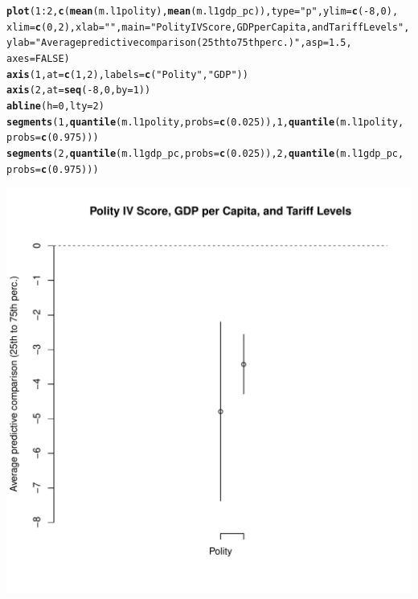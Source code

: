 \documentclass[12pt]{article}\usepackage[]{graphicx}\usepackage[]{color}
\makeatletter
\def\maxwidth{ %
  \ifdim\Gin@nat@width>\linewidth
    \linewidth
  \else
    \Gin@nat@width
  \fi
}
\newcommand{\hlnum}[1]{\textcolor[rgb]{0.686,0.059,0.569}{#1}}%
\newcommand{\hlstr}[1]{\textcolor[rgb]{0.192,0.494,0.8}{#1}}%
\newcommand{\hlopt}[1]{\textcolor[rgb]{0,0,0}{#1}}%
\newcommand{\hlstd}[1]{\textcolor[rgb]{0.345,0.345,0.345}{#1}}%
\newcommand{\hlkwc}[1]{\textcolor[rgb]{0.333,0.667,0.333}{#1}}%
\newcommand{\hlkwd}[1]{\textcolor[rgb]{0.737,0.353,0.396}{\textbf{#1}}}%
\newenvironment{kframe}{%
 \def\at@end@of@kframe{}%
 \ifinner\ifhmode%
  \def\at@end@of@kframe{\end{minipage}}%
  \begin{minipage}{\columnwidth}%
 \fi\fi%
 \def\FrameCommand##1{\hskip\@totalleftmargin \hskip-\fboxsep
 \colorbox{shadecolor}{##1}\hskip-\fboxsep
     \hskip-\linewidth \hskip-\@totalleftmargin \hskip\columnwidth}%
 \MakeFramed {\advance\hsize-\width
   \@totalleftmargin\z@ \linewidth\hsize
   \@setminipage}}%
 {\par\unskip\endMakeFramed%
 \at@end@of@kframe}
\newenvironment{knitrout}{}{} %
\makeatother
\begin{document}
\begin{knitrout}
\begin{kframe}
\begin{alltt}
\hlkwd{plot}\hlstd{(}\hlnum{1}\hlopt{:}\hlnum{2}\hlstd{,} \hlkwd{c}\hlstd{(}\hlkwd{mean}\hlstd{(m.l1polity),} \hlkwd{mean}\hlstd{(m.l1gdp_pc)),} \hlkwc{type} \hlstd{=} \hlstr{"p"}\hlstd{,} \hlkwc{ylim} \hlstd{=} \hlkwd{c}\hlstd{(}\hlopt{-}\hlnum{8}\hlstd{,} \hlnum{0}\hlstd{),}
    \hlkwc{xlim} \hlstd{=} \hlkwd{c}\hlstd{(}\hlnum{0}\hlstd{,} \hlnum{2}\hlstd{),} \hlkwc{xlab} \hlstd{=} \hlstr{""}\hlstd{,} \hlkwc{main} \hlstd{=} \hlstr{"Polity IV Score, GDP per Capita, and Tariff Levels"}\hlstd{,}
    \hlkwc{ylab} \hlstd{=} \hlstr{"Average predictive comparison (25th to 75th perc.)"}\hlstd{,} \hlkwc{asp} \hlstd{=} \hlnum{1.5}\hlstd{,}
    \hlkwc{axes} \hlstd{=} \hlnum{FALSE}\hlstd{)}
\hlkwd{axis}\hlstd{(}\hlnum{1}\hlstd{,} \hlkwc{at} \hlstd{=} \hlkwd{c}\hlstd{(}\hlnum{1}\hlstd{,} \hlnum{2}\hlstd{),} \hlkwc{labels} \hlstd{=} \hlkwd{c}\hlstd{(}\hlstr{"Polity"}\hlstd{,} \hlstr{"GDP"}\hlstd{))}
\hlkwd{axis}\hlstd{(}\hlnum{2}\hlstd{,} \hlkwc{at} \hlstd{=} \hlkwd{seq}\hlstd{(}\hlopt{-}\hlnum{8}\hlstd{,} \hlnum{0}\hlstd{,} \hlkwc{by} \hlstd{=} \hlnum{1}\hlstd{))}
\hlkwd{abline}\hlstd{(}\hlkwc{h} \hlstd{=} \hlnum{0}\hlstd{,} \hlkwc{lty} \hlstd{=} \hlnum{2}\hlstd{)}
\hlkwd{segments}\hlstd{(}\hlnum{1}\hlstd{,} \hlkwd{quantile}\hlstd{(m.l1polity,} \hlkwc{probs} \hlstd{=} \hlkwd{c}\hlstd{(}\hlnum{0.025}\hlstd{)),} \hlnum{1}\hlstd{,} \hlkwd{quantile}\hlstd{(m.l1polity,}
    \hlkwc{probs} \hlstd{=} \hlkwd{c}\hlstd{(}\hlnum{0.975}\hlstd{)))}
\hlkwd{segments}\hlstd{(}\hlnum{2}\hlstd{,} \hlkwd{quantile}\hlstd{(m.l1gdp_pc,} \hlkwc{probs} \hlstd{=} \hlkwd{c}\hlstd{(}\hlnum{0.025}\hlstd{)),} \hlnum{2}\hlstd{,} \hlkwd{quantile}\hlstd{(m.l1gdp_pc,}
    \hlkwc{probs} \hlstd{=} \hlkwd{c}\hlstd{(}\hlnum{0.975}\hlstd{)))}
\end{alltt}
\end{kframe}
\includegraphics[width=\maxwidth]{figure/unnamed-chunk-8-1} 

\end{knitrout}
\end{document}
